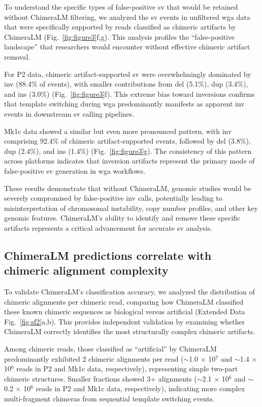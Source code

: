 \documentclass[pdflatex,sn-nature]{sn-jnl}%
\theoremstyle{thmstyleone}%
\theoremstyle{thmstyletwo}%
\theoremstyle{thmstylethree}%
\begin{document}
To understand the specific types of false-positive \gls{sv} that would be retained without ChimeraLM filtering, we analyzed the \gls{sv} events in unfiltered \gls{wga} data that were specifically supported by reads classified as chimeric artifacts by ChimeraLM (Fig.~\ref{fig:figure3}f,g).
This analysis profiles the ``false-positive landscape'' that researchers would encounter without effective chimeric artifact removal.

For P2 data, chimeric artifact-supported \gls{sv} were overwhelmingly dominated by \gls{inv} (88.4\% of events), with smaller contributions from \gls{del} (5.1\%), \gls{dup} (3.4\%), and \gls{ins} (3.0\%) (Fig.~\ref{fig:figure3}f).
This extreme bias toward inversions confirms that template switching during \gls{wga} predominantly manifests as apparent \gls{inv} events in downstream \gls{sv} calling pipelines.

Mk1c data showed a similar but even more pronounced pattern, with \gls{inv} comprising 92.4\% of chimeric artifact-supported events, followed by \gls{del} (3.8\%), \gls{dup} (2.4\%), and \gls{ins} (1.4\%) (Fig.~\ref{fig:figure3}g).
The consistency of this pattern across platforms indicates that inversion artifacts represent the primary mode of false-positive \gls{sv} generation in \gls{wga} workflows.

These results demonstrate that without ChimeraLM, genomic studies would be severely compromised by false-positive \gls{inv} calls, potentially leading to misinterpretation of chromosomal instability, copy number profiles, and other key genomic features.
ChimeraLM's ability to identify and remove these specific artifacts represents a critical advancement for accurate \gls{sv} analysis.

\subsection*{ChimeraLM predictions correlate with chimeric alignment complexity}

To validate ChimeraLM's classification accuracy, we analyzed the distribution of chimeric alignments per chimeric read, comparing how ChimeraLM classified these known chimeric sequences as biological versus artificial (Extended Data Fig.~\ref{fig:sf2}a,b).
This provides independent validation by examining whether ChimeraLM correctly identifies the most structurally complex chimeric artifacts.

Among chimeric reads, those classified as ``artificial'' by ChimeraLM predominantly exhibited 2 chimeric alignments per read ($\sim$1.0 $\times$ 10$^7$ and $\sim$1.4 $\times$ 10$^6$ reads in P2 and Mk1c data, respectively), representing simple two-part chimeric structures.
Smaller fractions showed 3+ alignments ($\sim$2.1 $\times$ 10$^6$ and $\sim$0.2 $\times$ 10$^6$ reads in P2 and Mk1c data, respectively), indicating more complex multi-fragment chimeras from sequential template switching events.
\end{document}
